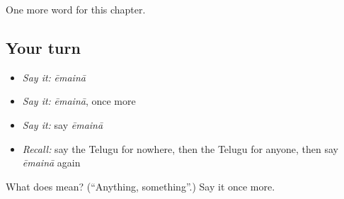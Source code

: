 \begin{grammarlens}[title={What you've built}]
One more word for this chapter.
\end{grammarlens}

\subsection*{Your turn}
\begin{itemize}
\raggedright
  \item \emph{Say it:} \emph{ēmainā}
  \item \emph{Say it:} \emph{ēmainā}, once more
  \item \emph{Say it:} say \emph{ēmainā}
  \item \emph{Recall:} say the Telugu for nowhere, then the Telugu for anyone, then say \emph{ēmainā} again
\end{itemize}

\begin{tcolorbox}[breakable,colback=teal!4,colframe=teal!35!black,title={Before you move on}]
What does  mean? (\textquotedblleft{}Anything, something\textquotedblright{}.) Say it once more.
\end{tcolorbox}
